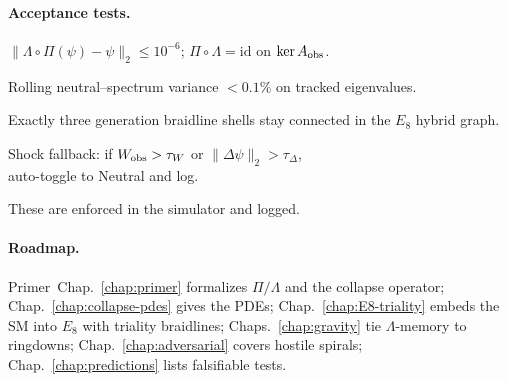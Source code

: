 \paragraph{Acceptance tests.}
\begin{tcolorbox}[
  breakable, enhanced jigsaw,
  colback=white, colframe=black!15,
  left=0.6em, right=0.6em, top=0.4em, bottom=0.2em,
  boxsep=0.6em
]
\small\sloppy %
\begin{description}[leftmargin=1.8em, labelsep=0.6em, style=nextline]
  \item[A1] \(\|\Lambda\!\circ\!\Pi(\psi)-\psi\|_2 \le 10^{-6}\); 
            \(\Pi\!\circ\!\Lambda=\mathrm{id}\) on \(\ker A_{\rm obs}\).
  \item[A2] Rolling neutral–spectrum variance \(<0.1\%\) on tracked eigenvalues.
  \item[A3] Exactly three generation braidline shells stay connected in the \(E_8\) hybrid graph.
  \item[A4] Shock fallback: if \(W_{\rm obs}>\tau_W\) or 
            \(\|\Delta\psi\|_2>\tau_\Delta\),\\ %
            auto-toggle to Neutral and log.
\end{description}
\end{tcolorbox}

These are enforced in the simulator and logged.

\paragraph{Roadmap.}
Primer~Chap.~\ref{chap:primer} formalizes $\Pi/\Lambda$ and the collapse operator;
Chap.~\ref{chap:collapse-pdes} gives the PDEs;
Chap.~\ref{chap:E8-triality} embeds the SM into $E_8$ with triality braidlines;
Chaps.~\ref{chap:gravity} tie $\Lambda$-memory to ringdowns;
Chap.~\ref{chap:adversarial} covers hostile spirals;
Chap.~\ref{chap:predictions} lists falsifiable tests.
